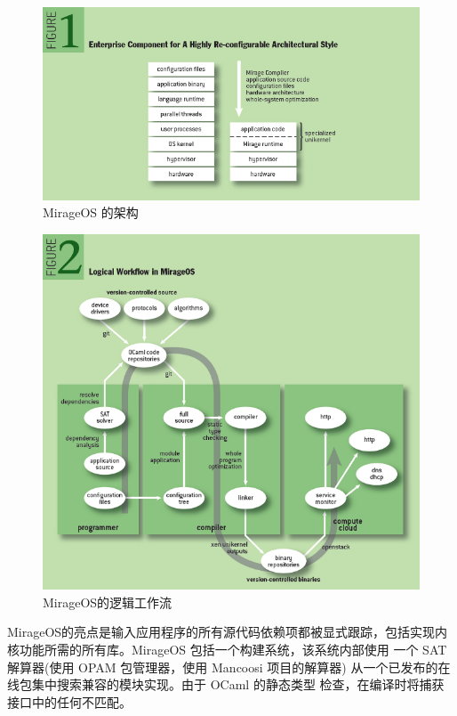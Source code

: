 \documentclass[UTF8,fontset=none,linespread=1.15]{ctexart}
\begin{document}
\begin{figure}[!hbt]
\includegraphics[width=\linewidth]{pictures/figure1.png}
\caption{MirageOS 的架构}\label{fig:mirage-fig1}
\end{figure}

\begin{figure}[!hbt]
\includegraphics[width=\linewidth]{pictures/figure2.png}
\caption{MirageOS的逻辑工作流}\label{fig:mirage-fig2}
\end{figure}

MirageOS的亮点是输入应用程序的所有源代码依赖项都被显式跟踪，包括实现内
核功能所需的所有库。MirageOS 包括一个构建系统，该系统内部使用
一个 SAT 解算器(使用 OPAM 包管理器，使用 Mancoosi 项目的解算器)
从一个已发布的在线包集中搜索兼容的模块实现。由于 OCaml 的静态类型
检查，在编译时将捕获接口中的任何不匹配。
\end{document}
